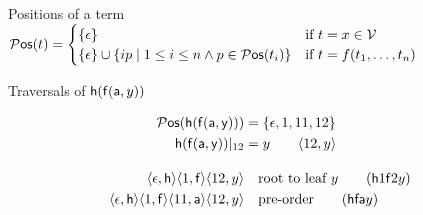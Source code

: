 

\begin{block}{Positions of a term}
$
	{}{\mathcal P}\mathsf{os}(t) =  
	\begin{cases}
		\{ \epsilon \} & \text{if }t=x\in{\mathcal V} \\
		\{ \epsilon \} \cup \{ ip\mid 1\leq i\leq n \land p\in{}{\mathcal P}\mathsf{os}(t_i)\} &
		\text{if }t=f(t_1,\ldots,t_n)
	\end{cases}
$
\end{block}

%

\begin{block}{Traversals of ${\mathsf h}({\mathsf f}({\mathsf a},y))$}
	\vspace{-1em}
\begin{minipage}[c]{3.1cm}
\end{minipage}
%
\begin{minipage}[c]{8.5cm}
\begin{align*}
\Pos(\mh(\mf(\ma,\my))) &= \{ \epsilon, 1, 11, 12 \}
\\
\mh(\mf(\ma,\my))|_{12} &= y \tag*{$\ANGLES{12,y}$}
\\[1em]
\ANGLES{\epsilon,\mh}\ANGLES{1,\mf}\ANGLES{12,y}
&\quad 
\text{root to leaf $y$} 
\tag{$\mh 1 \mf 2 y$}
\\
\ANGLES{\epsilon,\mh}\ANGLES{1,\mf}\ANGLES{11,\ma}\ANGLES{12,y}
&\quad
\text{pre-order} 
\tag{$\mh \mf \ma y$}
\end{align*}
%
\end{minipage}
\end{block}
